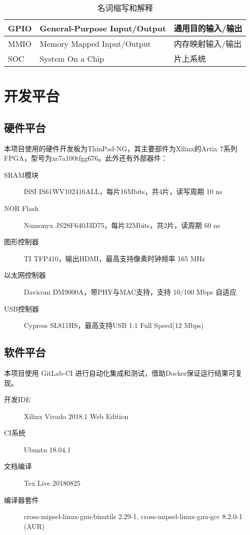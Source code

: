 \begin{table}[!htbp]
\begin{tabular}{|l|l|l|}
    GPIO                              & General-Purpose Input/Output                       & 通用目的输入/输出                        \\ \hline
    MMIO                              & Memory Mapped Input/Output                         & 内存映射输入/输出                        \\ \hline
    SOC                               & System On a Chip                                   & 片上系统                             \\ \hline
    \end{tabular}

    \caption{名词缩写和解释}
    \label{table:abbreviation_definition}

\end{table}

\section{开发平台}

\subsection{硬件平台}

本项目使用的硬件开发板为ThinPad-NG，其主要部件为Xilinx的Artix 7系列FPGA，型号为xc7a100tfgg676。此外还有外部器件：

\begin{description}
    \item[SRAM模块] ISSI IS61WV102416ALL，每片16Mbits，共4片，读写周期 10 ns
    \item[NOR Flash] Numonyx JS28F640J3D75，每片32Mbits，共2片，读周期 60 ns
    \item[图形控制器] TI TFP410，输出HDMI，最高支持像素时钟频率 165 MHz
    \item[以太网控制器] Davicom DM9000A，带PHY与MAC支持，支持 10/100 Mbps 自适应
    \item[USB控制器] Cypress SL811HS，最高支持USB 1.1 Full Speed(12 Mbps)
\end{description}

\subsection{软件平台}

本项目使用 GitLab-CI 进行自动化集成和测试，借助Docker保证运行结果可复现。

\begin{description}
    \item[开发IDE] Xilinx Vivado 2018.1 Web Edition
    \item[CI系统] Ubuntu 18.04.1
    \item[文档编译] Tex Live 20180825
    \item[编译器套件] cross-mipsel-linux-gnu-binutils 2.29-1, cross-mipsel-linux-gnu-gcc 8.2.0-1 (AUR)
\end{description}

